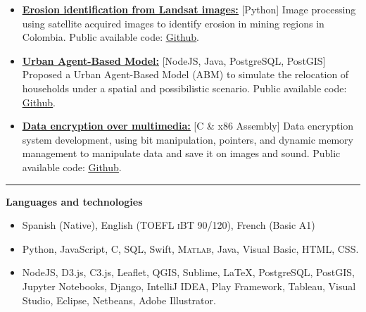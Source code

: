\documentclass[10pt]{article}
\begin{document}
{{\begin{itemize}
\item \textcolor{blue}{\href{https://github.com/mvanegas10/ErosionIdentificationFromLandsatImages}{\underline{\textbf{Erosion identification from Landsat images:}}}} [Python] Image processing using satellite acquired images to identify erosion in mining regions in Colombia. Public available code: \textcolor{blue}{\href{https://github.com/mvanegas10/ErosionIdentificationFromLandsatImages}{\underline{Github}}}.

\item \textcolor{blue}{\href{https://github.com/mvanegas10/kobdig-validation}{\underline{\textbf{Urban Agent-Based Model:}}}} [NodeJS, Java, PostgreSQL, PostGIS] Proposed a Urban Agent-Based Model \textsc(ABM) to simulate the relocation of households under a spatial and possibilistic scenario. Public available code: \textcolor{blue}{\href{https://github.com/mvanegas10/kobdig-validation}{\underline{Github}}}.

\item \textcolor{blue}{\href{https://github.com/mvanegas10/DataEncryption}{\underline{\textbf{Data encryption over multimedia:}}}} [C \& x86 Assembly] Data encryption system development, using bit manipulation, pointers, and dynamic memory management to manipulate data and save it on images and sound. Public available code: \textcolor{blue}{\href{https://github.com/mvanegas10/DataEncryption}{\underline{Github}}}.
\end{itemize}}

\vspace{0.25cm}
\hrule
\vspace{0.25cm}
{\large \textbf{Languages and technologies}}
\vspace{0.25cm}
{\footnotesize
\begin{itemize}
	\item Spanish (Native), English (\textsc{TOEFL iBT} 90/120), French (Basic A1)
	\item Python, JavaScript, C, SQL, Swift, \textsc{Matlab}, Java, Visual Basic, \textsc{HTML}, \textsc{CSS}.
	\item NodeJS, D3.js, C3.js, Leaflet, QGIS, Sublime, \LaTeX, PostgreSQL, PostGIS, Jupyter Notebooks, Django, IntelliJ IDEA, Play Framework, Tableau, Visual Studio, Eclipse, Netbeans, Adobe Illustrator.
\end{itemize}}

}
\end{document}
